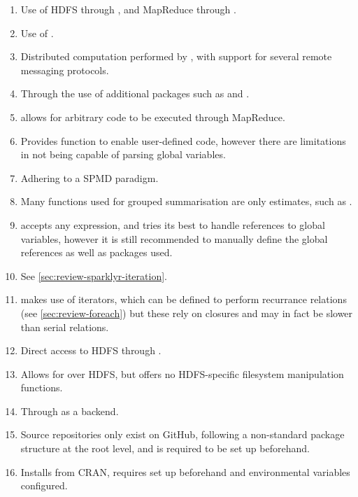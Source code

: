 \begin{enumerate}
\item\label{itm:x1} Use of HDFS through \cite{revo2013rhdfs}, and MapReduce through \cite{revo2014plyrmr}.
\item\label{itm:x2} Use of \cite{luraschi20}.
\item\label{itm:x3} Distributed computation performed by , with support for several remote messaging protocols\cites{Chen2012pbdMPIpackage,Schmidt2015pbdCSpackage}.
\item\label{itm:x4} Through the use of additional packages such as  and \cites{weston17,luraschi20}.
\item\label{itm:x5} \cite{revo2015rmr2} allows for arbitrary \R code to be executed through MapReduce.
\item\label{itm:x6}Provides  function to enable user-defined code, however there are limitations in not being capable of parsing global variables.
\item\label{itm:x7} Adhering to a SPMD paradigm.
\item\label{itm:x8} Many functions used for grouped summarisation are only estimates, such as \cite{zj19:_group_by}.
\item\label{itm:x9}  accepts any expression, and tries its best to handle references to global variables, however it is still recommended to manually define the global references as well as packages used.
\item\label{itm:x10} See \cref{sec:review-sparklyr-iteration}.
\item\label{itm:x11}  makes use of iterators, which can be defined to perform recurrance relations (see \cref{sec:review-foreach}) but these rely on closures and may in fact be slower than serial relations.
\item\label{itm:x12} Direct access to HDFS through \cite{revo2013rhdfs}.
\item\label{itm:x13} Allows for  over HDFS, but offers no HDFS-specific filesystem manipulation functions.
\item\label{itm:x14} Through  as a backend.
\item\label{itm:x15} Source repositories only exist on GitHub, following a non-standard package structure at the root level, and  is required to be set up beforehand.
\item\label{itm:x16} Installs from CRAN, requires  set up beforehand and environmental variables configured.

\end{enumerate}
